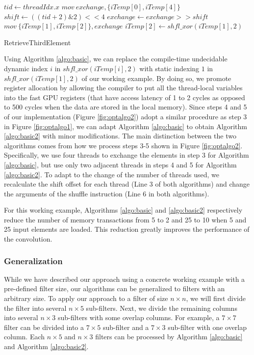 \begin{algorithm}[t!]
\small

	$tid \gets threadIdx.x$\;
	$mov\ exchange, \{iTemp[0], iTemp[4]\}$\;
	$shift \gets ((tid+2)\&2)<<4$\;
	$exchange \gets exchange >> shift$\;
	$mov\ \{iTemp[1],iTemp[2]\}, exchange$\;
	$iTemp[2] \gets shfl\_xor(iTemp[1],2)$\;	
	
	\caption{RetrieveThirdElement}
	\label{algo:basic}
	
\end{algorithm}

Using Algorithm \ref{algo:basic}, we can replace the compile-time undecidable dynamic index $i$ in $shfl\_xor(iTemp[i],2)$ with static indexing $1$ in $shfl\_xor(iTemp[1],2)$ of our working example.
By doing so, we promote register allocation by allowing the compiler to put all the thread-local variables into the fast GPU registers (that have access latency of 1 to 2 cycles as opposed to 500 cycles when the data are stored in the local memory).
Since steps 4 and 5 of our implementation (Figure \ref{fig:optalgo2}) adopt a similar procedure as step 3 in Figure \ref{fig:optalgo1}, we can adapt Algorithm \ref{algo:basic} to obtain Algorithm \ref{algo:basic2} with minor modifications.
The main distinction between the two algorithms comes from how we process steps 3-5 shown in Figure \ref{fig:optalgo2}.
Specifically, we use four threads to exchange the elements in step 3 for Algorithm \ref{algo:basic}, but use only two adjacent threads in steps 4 and 5 for Algorithm \ref{algo:basic2}.
To adapt to the change of the number of threads used, we recalculate the shift offset for each thread (Line 3 of both algorithms) and change the arguments of the shuffle instruction (Line 6 in both algorithms).

For this working example, Algorithms \ref{algo:basic} and \ref{algo:basic2} respectively reduce the number of memory transactions from 5 to 2 and 25 to 10 when 5 and 25 input elements are loaded.
This reduction greatly improves the performance of the convolution.

\subsubsection{Generalization} While we have described our approach using a concrete working example with a pre-defined filter size, our
algorithms can be generalized to filters with an arbitrary size.
To apply our approach to a filter of size $n \times n$, we will first
divide the filter into several $n \times 5$ sub-filters.
Next, we divide the remaining columns into several $n \times 3$ sub-filters with some overlap columns.
For example, a $7 \times 7$ filter can be divided into a $7 \times 5$ sub-filter and a $7 \times 3$ sub-filter with one overlap column.
Each $n \times 5$ and $n \times 3$ filters can be processed by Algorithm \ref{algo:basic} and Algorithm \ref{algo:basic2}.


